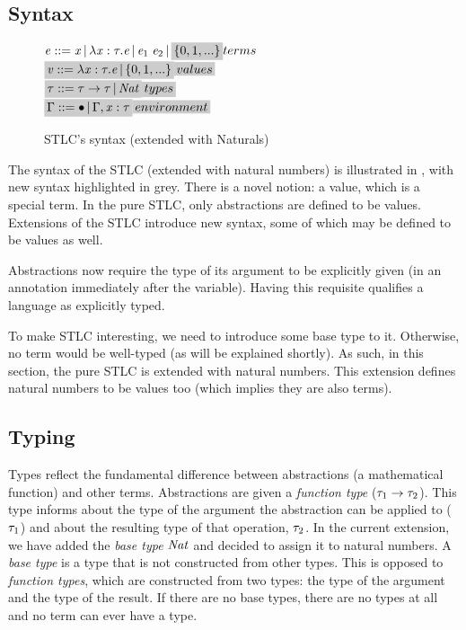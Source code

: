 \subsection{Syntax}
\begin{figure}
  $\term ::= \tmVar\,|\,\lambda \tmVar:\type.\term\,|\,\term_1 \; \term_2 \,|\, \highlight{\{0,1,...\}} \hfill terms $\\
  $\highlight{\tmVal::= \lambda \tmVar:\type.\term \,|\, \{0,1,...\}} \hfill \highlight{values}$\\
  $\highlight{\type ::= \type \rightarrow \type \,|\,\Nat} \hfill \highlight{types}$\\
  $\highlight{\tyEnv::=  \bullet \,|\, \tyEnv, \tmVar:\type} \hfill \highlight{environment}$\\
    \caption{STLC's syntax (extended with Naturals)}
  \label{STLC syntax}
\end{figure}

The syntax of the STLC (extended with natural numbers) is illustrated in , with new syntax highlighted in grey. There is a novel notion: a value, which is a special term. In the pure STLC, only abstractions are defined to be values. Extensions of the STLC introduce new syntax, some of which may be defined to be values as well.

Abstractions now require the type of its argument to be explicitly given (in an annotation immediately after the variable). Having this requisite qualifies a language as explicitly typed.

To make STLC interesting, we need to introduce some base type to it. Otherwise, no term would be well-typed (as will be explained shortly). As such, in this section, the pure STLC is extended with natural numbers. This extension defines natural numbers to be values too (which implies they are also terms).

\subsection{Typing}

Types reflect the fundamental difference between abstractions (a mathematical function) and other terms. Abstractions are given a \textit{function type} ($\mathit{\tau}_1 \rightarrow \mathit{\tau}_2$). This type informs about the type of the argument the abstraction can be applied to ($\mathit{\tau}_1$) and about the resulting type of that operation, $\mathit{\tau}_2$. In the current extension, we have added the \textit{base type} $\mathit{Nat}$ and decided to assign it to natural numbers. A \textit{base type} is a type that is not constructed from other types. This is opposed to \textit{function types}, which are constructed from two types: the type of the argument and the type of the result. If there are no base types, there are no types at all and no term can ever have a type.

